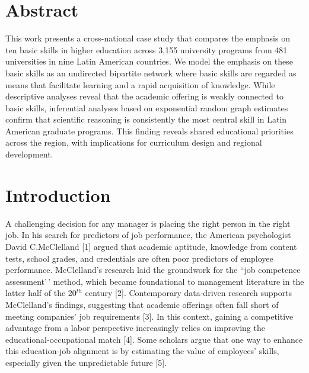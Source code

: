 \documentclass[10pt,letterpaper]{article}
\begin{document}
\section*{Abstract}
This work presents a cross-national case study that compares the emphasis on ten basic skills in
higher education across 3,155 university programs from 481 universities in nine Latin American
countries. We model the emphasis on these basic skills as an undirected bipartite network where
basic skills are regarded as means that facilitate learning and a rapid acquisition of knowledge.
While descriptive analyses reveal that the academic offering is weakly connected to basic
skills, inferential analyses based on exponential random graph estimates confirm that scientific
reasoning is consistently the most central skill in Latin American graduate programs. This
finding reveals shared educational priorities across the region, with implications for curriculum
design and regional development.


\linenumbers

\section{Introduction}\label{introduction}

A challenging decision for any manager is placing the right person in
the right job. In his search for predictors of job performance, the
American psychologist David C.McClelland {[}1{]} argued that academic
aptitude, knowledge from content tests, school grades, and credentials
are often poor predictors of employee performance. McClelland's research
laid the groundwork for the ``job competence assessment'\,' method,
which became foundational to management literature in the latter half of
the 20\(^{th}\) century {[}2{]}. Contemporary data-driven research
supports McClelland's findings, suggesting that academic offerings often
fall short of meeting companies' job requirements {[}3{]}. In this
context, gaining a competitive advantage from a labor perspective
increasingly relies on improving the educational-occupational match
{[}4{]}. Some scholars argue that one way to enhance this education-job
alignment is by estimating the value of employees' skills, especially
given the unpredictable future {[}5{]}.
\end{document}
